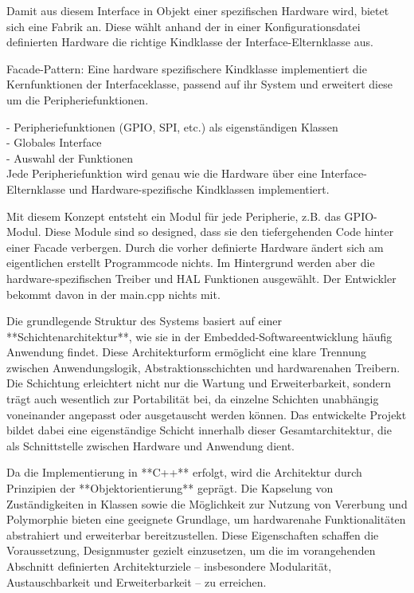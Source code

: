 Damit aus diesem Interface in Objekt einer spezifischen Hardware wird, bietet sich eine Fabrik an.
Diese wählt anhand der in einer Konfigurationsdatei definierten Hardware die richtige Kindklasse der Interface-Elternklasse aus.

Facade-Pattern:
Eine hardware spezifischere Kindklasse implementiert die Kernfunktionen der Interfaceklasse, passend auf ihr System und erweitert diese um die Peripheriefunktionen.

- Peripheriefunktionen (GPIO, SPI, etc.) als eigenständigen Klassen\\
- Globales Interface\\
- Auswahl der Funktionen\\
Jede Peripheriefunktion wird genau wie die Hardware über eine Interface-Elternklasse und Hardware-spezifische Kindklassen implementiert.

Mit diesem Konzept entsteht ein Modul für jede Peripherie, z.B. das GPIO-Modul.
Diese Module sind so designed, dass sie den tiefergehenden Code hinter einer Facade verbergen.
Durch die vorher definierte Hardware ändert sich am eigentlichen erstellt Programmcode nichts.
Im Hintergrund werden aber die hardware-spezifischen Treiber und HAL Funktionen ausgewählt.
Der Entwickler bekommt davon in der main.cpp nichts mit.


Die grundlegende Struktur des Systems basiert auf einer **Schichtenarchitektur**, wie sie in der Embedded-Softwareentwicklung häufig Anwendung findet. Diese Architekturform ermöglicht eine klare Trennung zwischen Anwendungslogik, Abstraktionsschichten und hardwarenahen Treibern. Die Schichtung erleichtert nicht nur die Wartung und Erweiterbarkeit, sondern trägt auch wesentlich zur Portabilität bei, da einzelne Schichten unabhängig voneinander angepasst oder ausgetauscht werden können. Das entwickelte Projekt bildet dabei eine eigenständige Schicht innerhalb dieser Gesamtarchitektur, die als Schnittstelle zwischen Hardware und Anwendung dient.

Da die Implementierung in **C++** erfolgt, wird die Architektur durch Prinzipien der **Objektorientierung** geprägt. Die Kapselung von Zuständigkeiten in Klassen sowie die Möglichkeit zur Nutzung von Vererbung und Polymorphie bieten eine geeignete Grundlage, um hardwarenahe Funktionalitäten abstrahiert und erweiterbar bereitzustellen. Diese Eigenschaften schaffen die Voraussetzung, Designmuster gezielt einzusetzen, um die im vorangehenden Abschnitt definierten Architekturziele – insbesondere Modularität, Austauschbarkeit und Erweiterbarkeit – zu erreichen.

